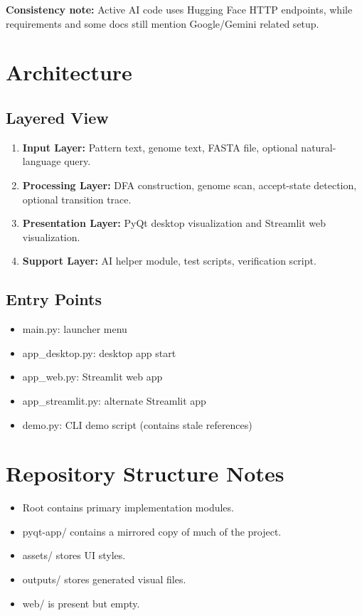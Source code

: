 \documentclass[11pt]{article}
\begin{document}
\textbf{Consistency note:} Active AI code uses Hugging Face HTTP endpoints, while requirements and some docs still mention Google/Gemini related setup.

\section{Architecture}
\subsection{Layered View}
\begin{enumerate}[leftmargin=*]
  \item \textbf{Input Layer:} Pattern text, genome text, FASTA file, optional natural-language query.
  \item \textbf{Processing Layer:} DFA construction, genome scan, accept-state detection, optional transition trace.
  \item \textbf{Presentation Layer:} PyQt desktop visualization and Streamlit web visualization.
  \item \textbf{Support Layer:} AI helper module, test scripts, verification script.
\end{enumerate}

\subsection{Entry Points}
\begin{itemize}[leftmargin=*]
  \item main.py: launcher menu
  \item app\_desktop.py: desktop app start
  \item app\_web.py: Streamlit web app
  \item app\_streamlit.py: alternate Streamlit app
  \item demo.py: CLI demo script (contains stale references)
\end{itemize}

\section{Repository Structure Notes}
\begin{itemize}[leftmargin=*]
  \item Root contains primary implementation modules.
  \item pyqt-app/ contains a mirrored copy of much of the project.
  \item assets/ stores UI styles.
  \item outputs/ stores generated visual files.
  \item web/ is present but empty.
\end{itemize}
\end{document}
